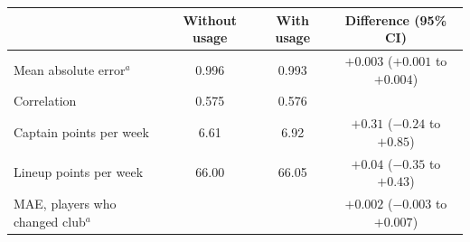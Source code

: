 \begin{tabular}{lccc}
\toprule
 & Without usage & With usage & Difference (95\% CI) \\
\midrule
Mean absolute error$^a$ & 0.996 & 0.993 & $+0.003$ ($+0.001$ to $+0.004$) \\
Correlation & 0.575 & 0.576 & \\
Captain points per week & 6.61 & 6.92 & $+0.31$ ($-0.24$ to $+0.85$) \\
Lineup points per week & 66.00 & 66.05 & $+0.04$ ($-0.35$ to $+0.43$) \\
MAE, players who changed club$^a$ & & & $+0.002$ ($-0.003$ to $+0.007$) \\
\bottomrule
\end{tabular}
